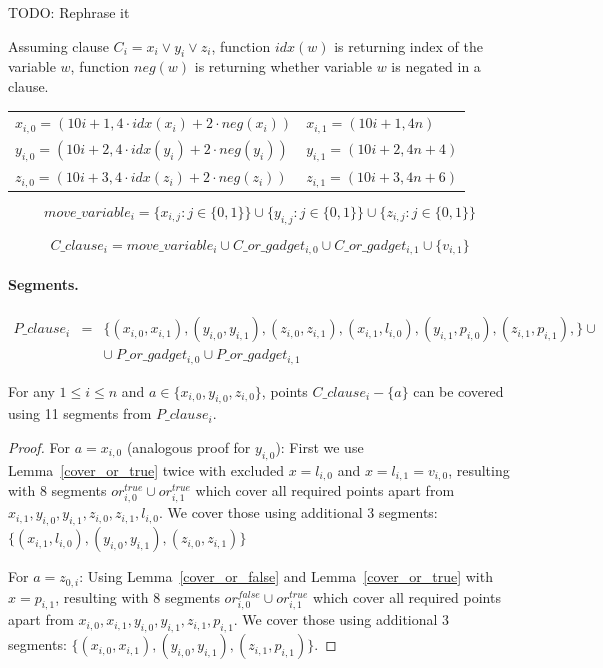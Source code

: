 TODO: Rephrase it

Assuming clause $C_i = x_i \lor y_i \lor z_i$,
function $idx(w)$ is returning index of the variable $w$,
function $neg(w)$ is returning whether variable $w$ is negated
in a clause.

\begin{center}
\begin{tabular}{ l l }
	$x_{i, 0} = (10i+1, 4\cdot idx(x_i) + 2\cdot neg(x_i))$ &
	$x_{i, 1} = (10i+1, 4n)$ \\
	$y_{i, 0} = (10i+2, 4\cdot idx(y_i) + 2\cdot neg(y_i))$ &
	$y_{i, 1} = (10i+2, 4n + 4)$ \\
	$z_{i, 0} = (10i+3, 4\cdot idx(z_i) + 2\cdot neg(z_i))$ &
	$z_{i, 1} = (10i+3, 4n + 6)$
\end{tabular}
\end{center}
	
 
 $$move\_variable_i = 
 \{x_{i, j} : j \in \{0, 1\}\} \cup
 \{y_{i, j} : j \in \{0, 1\}\} \cup
 \{z_{i, j} : j \in \{0, 1\}\} 
 $$
 
 $$C\_clause_i = 
 move\_variable_i \cup C\_or\_gadget_{i, 0}
 \cup C\_or\_gadget_{i, 1} \cup \{v_{i, 1} \} 
 $$

\paragraph{Segments.}

\begin{eqnarray*}
P\_clause_i & = & \{ (x_{i, 0}, x_{i, 1}),
(y_{i, 0}, y_{i, 1}),
(z_{i, 0}, z_{i, 1}),
(x_{i, 1}, l_{i, 0}),
(y_{i, 1}, p_{i, 0}),
(z_{i, 1}, p_{i, 1}),
\} \cup \\
& & \cup \ P\_or\_gadget_{i, 0} \cup P\_or\_gadget_{i, 1}
\end{eqnarray*}

\begin{lemma}
\label{cover_clauses_solution_true}
For any $1 \le i \le n$ and $a \in \{ x_{i, 0}, y_{i, 0}, z_{i, 0}\}$,
points $C\_clause_i - \{a\}$ can be covered using 11 segments
from $P\_clause_i$.
\end{lemma}

\begin{proof}
For $a = x_{i, 0}$ (analogous proof for $y_{i, 0}$):
First we use Lemma~\ref{cover_or_true} twice with excluded $x = l_{i, 0}$ and
$x = l_{i, 1} = v_{i, 0}$,
resulting with 8 segments $or^{true}_{i, 0} \cup or^{true}_{i, 1}$
which cover all required points apart from
$x_{i, 1}, y_{i, 0}, y_{i, 1}, z_{i, 0}, z_{i, 1}, l_{i, 0}$.
We cover those using additional 3 segments:
$\{ (x_{i, 1}, l_{i, 0}), (y_{i, 0}, y_{i, 1}),
(z_{i, 0}, z_{i, 1}) \}$

For $a = z_{0, i}$:
Using Lemma~\ref{cover_or_false} and Lemma~\ref{cover_or_true} with
$x = p_{i, 1}$,
resulting with 8 segments $or^{false}_{i, 0} \cup or^{true}_{i, 1}$
which cover all required points apart from
$x_{i, 0}, x_{i, 1}, y_{i, 0}, y_{i, 1}, z_{i, 1}, p_{i, 1}$.
We cover those using additional 3 segments:
$\{ (x_{i, 0}, x_{i, 1}), (y_{i, 0}, y_{i, 1}),
(z_{i, 1}, p_{i, 1}) \}$.
\end{proof}

